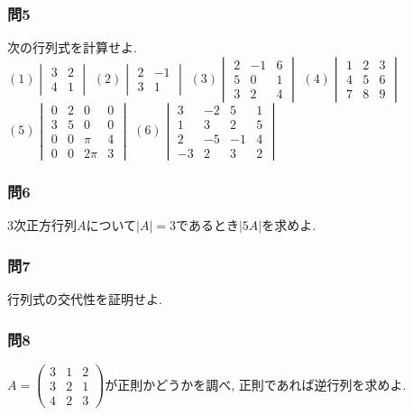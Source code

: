\documentclass[a4j,dvipdfmx]{jsarticle}
\numberwithin{equation}{section}
\begin{document}
        \subsubsection*{問5}次の行列式を計算せよ.\\
            $(1)\begin{vmatrix}3 & 2 \\ 4 & 1\end{vmatrix}$\hspace{1mm}
            $(2)\begin{vmatrix}2 & -1\\ 3 & 1\end{vmatrix}$\hspace{1mm}
            $(3)\begin{vmatrix}2 & -1 & 6 \\ 5 & 0 & 1 \\ 3 & 2 & 4\end{vmatrix}$\hspace{1mm}
            $(4)\begin{vmatrix}1 & 2 & 3 \\ 4 & 5 & 6 \\ 7 & 8 & 9\end{vmatrix}$\hspace{1mm}
            $(5)\begin{vmatrix}0 & 2 & 0 & 0 \\ 3 & 5 & 0 & 0 \\ 0 & 0 & \pi &4 \\ 0 & 0 & 2\pi & 3\end{vmatrix}$\hspace{1mm}
            $(6)\begin{vmatrix}3 & -2 & 5 & 1 \\ 1 & 3 & 2 & 5 \\ 2 & -5 & -1 & 4 \\ -3 & 2 & 3 & 2\end{vmatrix}$
        \subsubsection*{問6}3次正方行列$A$について$|A|=3$であるとき$|5A|$を求めよ.

        \subsubsection*{問7}行列式の交代性を証明せよ.

        \subsubsection*{問8}$A=\begin{pmatrix}
            3 & 1 & 2\\
            3 & 2 & 1\\
            4 & 2 & 3
        \end{pmatrix}$が正則かどうかを調べ, 正則であれば逆行列を求めよ.
        \vspace{-0.5cm}
\end{document}
